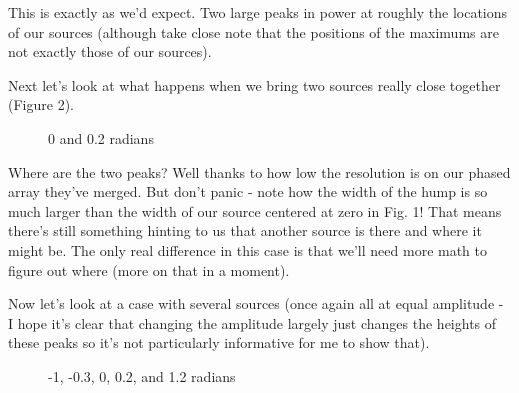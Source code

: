 \documentclass[10pt,a5paper]{book}
\begin{document}
This is exactly as we'd expect. Two large peaks in power at roughly the locations of our sources (although take close note that the positions of the maximums are not exactly those of our sources). 

Next let's look at what happens when we bring two sources really close together (Figure 2).

\begin{figure}[!htb]
\caption{\label{fig:my-label} 0 and 0.2 radians}
\end{figure}

Where are the two peaks? Well thanks to how low the resolution is on our phased array they've merged. But don't panic - note how the width of the hump is so much larger than the width of our source centered at zero in Fig. 1! That means there's still something hinting to us that another source is there and where it might be. The only real difference in this case is that we'll need more math to figure out where (more on that in a moment). 

Now let's look at a case with several sources (once again all at equal amplitude - I hope it's clear that changing the amplitude largely just changes the heights of these peaks so it's not particularly informative for me to show that). 

\begin{figure}[!htb]
\caption{\label{fig:my-label} -1, -0.3, 0, 0.2, and 1.2 radians}
\end{figure}
\end{document}
